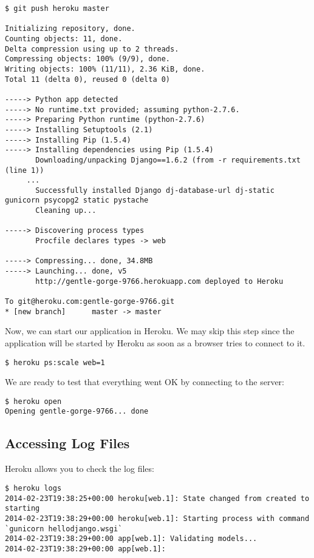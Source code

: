 \documentclass[12pt]{article} %
\begin{document}
\begin{verbatim}
$ git push heroku master
 
Initializing repository, done. 
Counting objects: 11, done. 
Delta compression using up to 2 threads. 
Compressing objects: 100% (9/9), done. 
Writing objects: 100% (11/11), 2.36 KiB, done. 
Total 11 (delta 0), reused 0 (delta 0) 
 
-----> Python app detected 
-----> No runtime.txt provided; assuming python-2.7.6. 
-----> Preparing Python runtime (python-2.7.6) 
-----> Installing Setuptools (2.1) 
-----> Installing Pip (1.5.4) 
-----> Installing dependencies using Pip (1.5.4) 
       Downloading/unpacking Django==1.6.2 (from -r requirements.txt (line 1)) 
     ...
       Successfully installed Django dj-database-url dj-static gunicorn psycopg2 static pystache 
       Cleaning up... 
 
-----> Discovering process types 
       Procfile declares types -> web 
 
-----> Compressing... done, 34.8MB 
-----> Launching... done, v5 
       http://gentle-gorge-9766.herokuapp.com deployed to Heroku 
 
To git@heroku.com:gentle-gorge-9766.git 
* [new branch]      master -> master 
 \end{verbatim}
Now, we can start our application in Heroku. We may skip this step since the application will be started by Heroku as soon as  a browser tries to connect to it.

 \begin{verbatim}
$ heroku ps:scale web=1
 \end{verbatim}

We are ready to test that everything went OK by connecting to the server:  

 \begin{verbatim}
$ heroku open
Opening gentle-gorge-9766... done
 \end{verbatim}


\subsection{Accessing Log Files}

 Heroku allows you to check the log files:
 
\begin{verbatim}
$ heroku logs
2014-02-23T19:38:25+00:00 heroku[web.1]: State changed from created to starting
2014-02-23T19:38:29+00:00 heroku[web.1]: Starting process with command `gunicorn hellodjango.wsgi`
2014-02-23T19:38:29+00:00 app[web.1]: Validating models...
2014-02-23T19:38:29+00:00 app[web.1]:
\end{verbatim}
\end{document}

